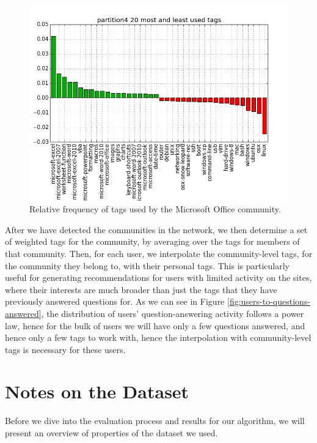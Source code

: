 \documentclass[a4paper]{article}
\begin{document}
\begin{figure}
\centering
\includegraphics[width=\columnwidth]{partition4-tags}
\caption{Relative frequency of tags used by the Microsoft Office community.}
\label{fig:msoffice-tags}
\end{figure}

After we have detected the communities in the network, we then determine a set of weighted tags for the community, by averaging over the tags for members of that community. Then, for each user, we interpolate the community-level tags, for the community they belong to, with their personal tags. This is particularly useful for generating recommendations for users with limited activity on the sites, where their interests are much broader than just the tags that they have previously answered questions for. As we can see in Figure \ref{fig:users-to-questions-answered}, the distribution of users' question-answering activity follows a power law, hence for the bulk of users we will have only a few questions answered, and hence only a few tags to work with, hence the interpolation with community-level tags is necessary for these users.

\section{Notes on the Dataset}

Before we dive into the evaluation process and results for our algorithm, we will present an overview of properties of the dataset we used.
\end{document}
